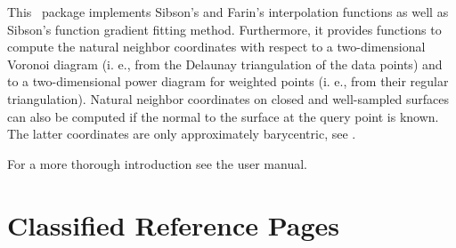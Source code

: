 This \cgal\ package implements Sibson's and Farin's interpolation
functions as well as Sibson's function gradient fitting method.
Furthermore, it provides functions to compute the natural neighbor
coordinates with respect to a two-dimensional Voronoi diagram (i. e., 
from the Delaunay triangulation of the data points) and to a
two-dimensional power diagram for weighted points (i. e., from their
regular triangulation).  Natural neighbor coordinates on closed and
well-sampled surfaces can also be computed if the normal to the
surface at the query point is known. The latter coordinates are only
approximately barycentric, see \cite{bf-lcss-02}.

For a more thorough introduction see the user manual.


\section{Classified Reference Pages}

\\
\\


 \\
 \\
 \\
 \\
 \\

 \\
 \\

 \\
 \\

\\
 \\

